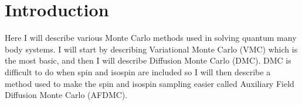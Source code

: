 \section*{Introduction}
Here I will describe various Monte Carlo methods used in solving quantum many body systems. I will start by describing Variational Monte Carlo (VMC) which is the most basic, and then I will describe Diffusion Monte Carlo (DMC). DMC is difficult to do when spin and isospin are included so I will then describe a method used to make the spin and isospin sampling easier called Auxiliary Field Diffusion Monte Carlo (AFDMC).
